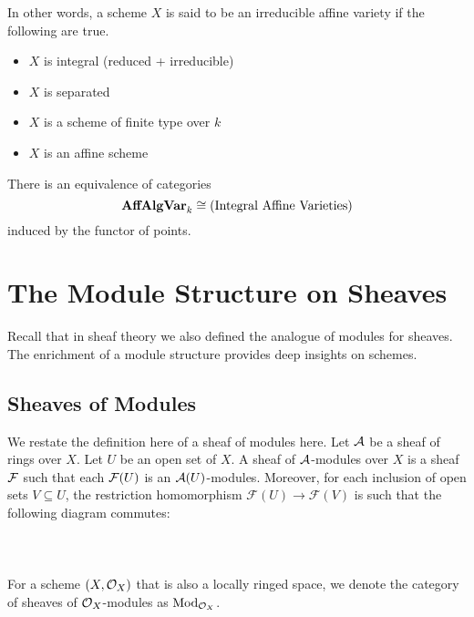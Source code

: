 \documentclass[a4paper]{article}
\begin{document}
In other words, a scheme $X$ is said to be an irreducible affine variety if the following are true. 
\begin{itemize}
\item $X$ is integral (reduced + irreducible)
\item $X$ is separated
\item $X$ is a scheme of finite type over $k$
\item $X$ is an affine scheme
\end{itemize}

\begin{thm}{}{} There is an equivalence of categories $$\bold{AffAlgVar}_k\cong(\text{Integral Affine Varieties})$$ induced by the functor of points. 
\end{thm}

\pagebreak
\section{The Module Structure on Sheaves}
Recall that in sheaf theory we also defined the analogue of modules for sheaves. The enrichment of a module structure provides deep insights on schemes. 

\subsection{Sheaves of Modules}
We restate the definition here of a sheaf of modules here. Let $\mathcal{A}$ be a sheaf of rings over $X$. Let $U$ be an open set of $X$. A sheaf of $\mathcal{A}$-modules over $X$ is a sheaf $\mathcal{F}$ such that each $\mathcal{F}(U)$ is an $\mathcal{A}(U)$-modules. Moreover, for each inclusion of open sets $V\subseteq U$, the restriction homomorphism $\mathcal{F}(U)\to\mathcal{F}(V)$ is such that the following diagram commutes: \\~\\
\\~\\

For a scheme $(X,\mathcal{O}_X)$ that is also a locally ringed space, we denote the category of sheaves of $\mathcal{O}_X$-modules as $\text{Mod}_{\mathcal{O}_X}$. \\~\\
\end{document}
